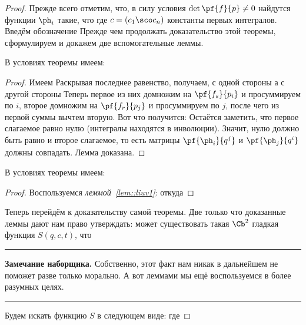 \documentclass[a4paper,12pt]{article}
\newcommand{\tstm}[1]{\emph{#1}}
\newenvironment{nbb}{\par\vskip3pt\hrule\vskip3pt\textbf{\footnotesize Замечание наборщика.}\footnotesize }
{\vskip3pt\hrule\par\vskip3pt}
\begin{document}
\begin{proof}
Прежде всего отметим, что, в силу условия $\det\pf{f}{p}\neq0$ найдутся функции $\ph_i$ такие, что
где $c=(c_1\sco c_n)$ константы первых интегралов.
Введём обозначение 
Прежде чем продолжать доказательство этой теоремы, сформулируем и докажем две вспомогательные леммы.
\begin{lemma}
\label{lem::liuv1}
В условиях теоремы имеем:
\end{lemma}
\begin{proof}
Имеем
Раскрывая последнее равенство, получаем, с одной стороны
а с другой стороны
Теперь первое из них домножим на $\pf{f_s}{p_i}$ и просуммируем по $i$, второе домножим на $\pf{f_r}{p_j}$
и просуммируем по $j$, после чего из первой суммы вычтем вторую. Вот что получится:
Остаётся заметить, что первое слагаемое равно нулю (интегралы находятся в инволюции). Значит, нулю должно быть
равно и второе слагаемое, то есть матрицы $\pf{\ph_i}{q^j}$ и $\pf{\ph_j}{q^i}$ должны совпадать. Лемма доказана.
\end{proof}
\begin{lemma}
\label{lem::liuv2}
В условиях теоремы имеем:
\end{lemma}
\begin{proof}
Воспользуемся \tstm{леммой~\ref{lem::liuv1}}:
откуда
\hfill\end{proof}
Теперь перейдём к доказательству самой теоремы. Две только что доказанные леммы дают нам право утверждать:
может существовать такая $\Cb^2$ гладкая функция $S(q,c,t)$, что
\begin{nbb}
Собственно, этот факт нам никак в дальнейшем не поможет разве только морально.
А вот леммами мы ещё воспользуемся в более разумных целях.
\end{nbb}
Будем искать функцию $S$ в следующем виде:
где

\end{proof}
\end{document}
